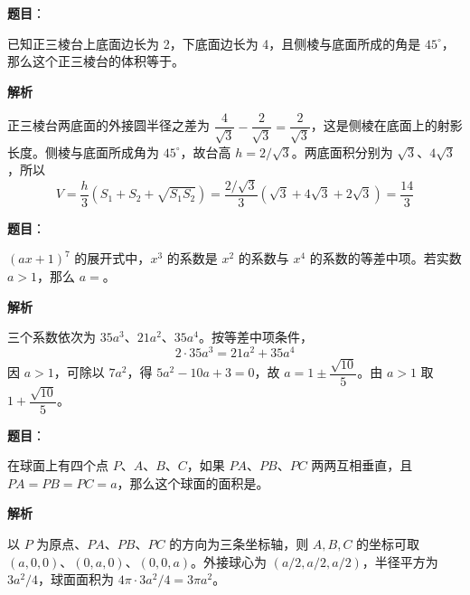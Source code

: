 \begin{answer}

\textbf{题目}：

已知正三棱台上底面边长为 2，下底面边长为 4，且侧棱与底面所成的角是 $45^\circ$，那么这个正三棱台的体积等于\underline{\hspace{6em}}。

\textbf{解析}

正三棱台两底面的外接圆半径之差为 $\dfrac4{\sqrt3}-\dfrac2{\sqrt3}=\dfrac2{\sqrt3}$，这是侧棱在底面上的射影长度。侧棱与底面所成角为 $45^\circ$，故台高 $h=2/\sqrt3$。两底面积分别为 $\sqrt3$、$4\sqrt3$，所以
\nopagebreak[4]
\[
V=\frac h3\left(S_1+S_2+\sqrt{S_1S_2}\right)
=\frac{2/\sqrt3}{3}(\sqrt3+4\sqrt3+2\sqrt3)
=\frac{14}3
\]


\end{answer}
\begin{answer}

\textbf{题目}：

$(ax+1)^7$ 的展开式中，$x^3$ 的系数是 $x^2$ 的系数与 $x^4$ 的系数的等差中项。若实数 $a>1$，那么 $a=$\underline{\hspace{6em}}。

\textbf{解析}

三个系数依次为 $35a^3$、$21a^2$、$35a^4$。按等差中项条件，
\nopagebreak[4]
\[
2\cdot35a^3=21a^2+35a^4
\]
因 $a>1$，可除以 $7a^2$，得 $5a^2-10a+3=0$，故 $a=1\pm\dfrac{\sqrt{10}}5$。由 $a>1$ 取 $1+\dfrac{\sqrt{10}}5$。


\end{answer}
\begin{answer}

\textbf{题目}：

在球面上有四个点 $P$、$A$、$B$、$C$，如果 $PA$、$PB$、$PC$ 两两互相垂直，且 $PA=PB=PC=a$，那么这个球面的面积是\underline{\hspace{6em}}。

\textbf{解析}

以 $P$ 为原点、$PA$、$PB$、$PC$ 的方向为三条坐标轴，则 $A,B,C$ 的坐标可取 $(a,0,0)$、$(0,a,0)$、$(0,0,a)$。外接球心为 $(a/2,a/2,a/2)$，半径平方为 $3a^2/4$，球面面积为 $4\pi\cdot3a^2/4=3\pi a^2$。


\end{answer}
